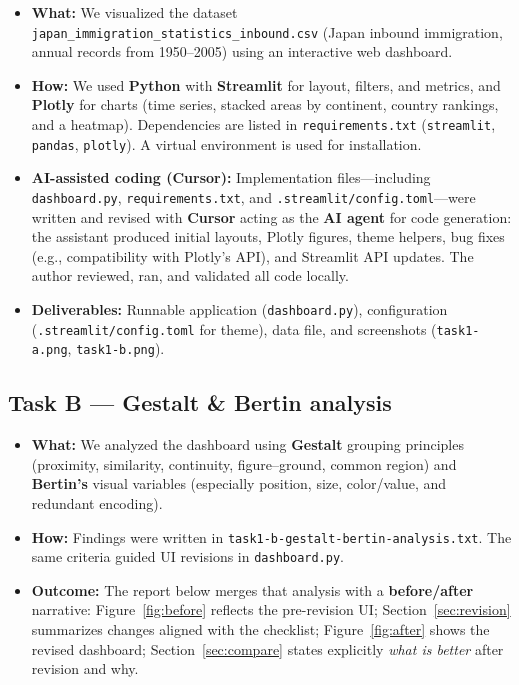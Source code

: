 \documentclass[11pt,a4paper]{article}
\begin{document}
\begin{itemize}[leftmargin=*]
  \item \textbf{What:} We visualized the dataset \texttt{japan\_immigration\_statistics\_inbound.csv} (Japan inbound immigration, annual records from 1950--2005) using an interactive web dashboard.
  \item \textbf{How:} We used \textbf{Python} with \textbf{Streamlit} for layout, filters, and metrics, and \textbf{Plotly} for charts (time series, stacked areas by continent, country rankings, and a heatmap). Dependencies are listed in \texttt{requirements.txt} (\texttt{streamlit}, \texttt{pandas}, \texttt{plotly}). A virtual environment is used for installation.
  \item \textbf{AI-assisted coding (Cursor):} Implementation files---including \texttt{dashboard.py}, \texttt{requirements.txt}, and \texttt{.streamlit/config.toml}---were written and revised with \textbf{Cursor} acting as the \textbf{AI agent} for code generation: the assistant produced initial layouts, Plotly figures, theme helpers, bug fixes (e.g., compatibility with Plotly's API), and Streamlit API updates. The author reviewed, ran, and validated all code locally.
  \item \textbf{Deliverables:} Runnable application (\texttt{dashboard.py}), configuration (\texttt{.streamlit/config.toml} for theme), data file, and screenshots (\texttt{task1-a.png}, \texttt{task1-b.png}).
\end{itemize}

\subsection{Task B --- Gestalt \& Bertin analysis}
\begin{itemize}[leftmargin=*]
  \item \textbf{What:} We analyzed the dashboard using \textbf{Gestalt} grouping principles (proximity, similarity, continuity, figure--ground, common region) and \textbf{Bertin's} visual variables (especially position, size, color/value, and redundant encoding).
  \item \textbf{How:} Findings were written in \texttt{task1-b-gestalt-bertin-analysis.txt}. The same criteria guided UI revisions in \texttt{dashboard.py}.
  \item \textbf{Outcome:} The report below merges that analysis with a \textbf{before/after} narrative: Figure~\ref{fig:before} reflects the pre-revision UI; Section~\ref{sec:revision} summarizes changes aligned with the checklist; Figure~\ref{fig:after} shows the revised dashboard; Section~\ref{sec:compare} states explicitly \emph{what is better} after revision and why.
\end{itemize}
\end{document}
